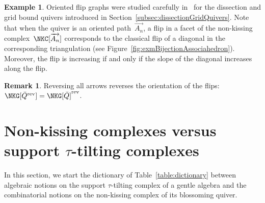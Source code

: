 \documentclass{amsart}
\theoremstyle{definition}
\newtheorem{example}[theorem]{Example}
\newtheorem{remark}[theorem]{Remark}
\newcommand{\ssm}{\smallsetminus} %
\newcommand{\eqdef}{\mbox{\,\raisebox{0.2ex}{\scriptsize\ensuremath{\mathrm:}}\ensuremath{=}\,}} %
\newcommand{\fref}[1]{Figure~\ref{#1}} %
\newcommand{\exmAn}{\overrightarrow{A_n}} %
\newcommand{\vincent}[1]{\todo[color=blue!30]{#1 \\ \hfill --- V.}}
\newcommand{\blossom}{^\text{\ding{96}}} %
\newcommand{\reversed}[1]{#1^{\mathrm{rev}}} %
\begin{document}
\begin{example}
Oriented flip graphs were studied carefully in~\cite{GarverMcConville, MannevillePilaud-accordion, McConville} for the dissection and grid bound quivers introduced in Section~\ref{subsec:dissectionGridQuivers}.
Note that when the quiver is an oriented path~$\exmAn$, a flip in a facet of the non-kissing complex~$\NKC[\exmAn]$ corresponds to the classical flip of a diagonal in the corresponding triangulation (see \fref{fig:exmBijectionAssociahedron}).
Moreover, the flip is increasing if and only if the slope of the diagonal increases along the flip.
\end{example}

\begin{remark}
\label{rem:reverseFlipGraph}
Reversing all arrows reverses the orientation of the flips: $\NKG[\reversed{\bar Q}] = \reversed{\NKG[\bar Q]}$.
\end{remark}

%
%


\section{Non-kissing complexes versus support $\tau$-tilting complexes}
\label{sec:nkcvsttc}

In this section, we start the dictionary of Table~\ref{table:dictionary} between algebraic notions on the support $\tau$-tilting complex of a gentle algebra and the combinatorial notions on the non-kissing complex of its blossoming quiver.
\end{document}
